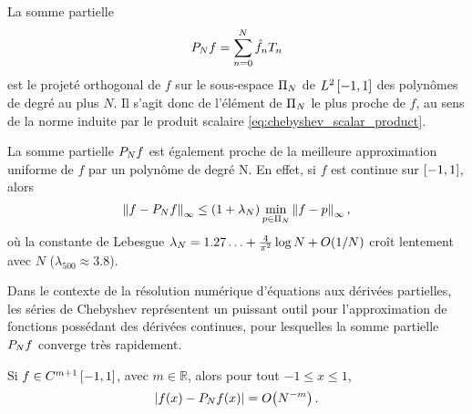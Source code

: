 La somme partielle
\begin{equation}
	\truncseries{f}{N} = \sum_{n=0}^{N} \hat{f}_n T_n
	\label{chebyshev_truncated_series}
\end{equation}
est le projeté orthogonal de $f$ sur le sous-espace $\polyspace{N}$ de $\Ltwospace$ des polynômes de degré au plus $N$.
Il s'agit donc de l'élément de $\polyspace{N}$ le plus proche de $f$, au sens de la norme induite par le produit scalaire \eqref{eq:chebyshev_scalar_product}.\par
La somme partielle $\truncseries{f}{N}$ est également proche de la meilleure approximation uniforme de $f$ par un polynôme de degré N. 
En effet, si $f$ est continue sur $\chebinterval$, alors
\begin{equation}
	\norminf{f - \truncseries{f}{N}} 
	\leq 
	\left(1 + \lambda_N \right) 
	\min_{p \in \polyspace{N}} \norminf{f - p},
	\label{eq:chebyshev_near_minimax}
\end{equation}
où la constante de Lebesgue $\lambda_N = 1.27\ldots + \frac{4}{\pi^2} \log N + \bigO{1/N}$ croît %
lentement avec $N$ ($\lambda_{500} \approx 3.8$).\par
Dans le contexte de la résolution numérique d'équations aux dérivées partielles, les séries de Chebyshev représentent un puissant outil pour l'approximation de fonctions possédant des dérivées continues, pour lesquelles la somme partielle $\truncseries{f}{N}$ converge très rapidement.
\begin{theoreme}
	Si $f \in C^{m+1}\chebinterval$, avec $m \in \mathbb{R}$, alors pour tout $-1\leq x \leq 1$,
	\begin{equation}
		\left| f(x) - \truncseries{f}{N}(x) \right| = \bigO{N^{-m}}.
		\label{eq:chebyshev_convergence}
	\end{equation}
\end{theoreme}
